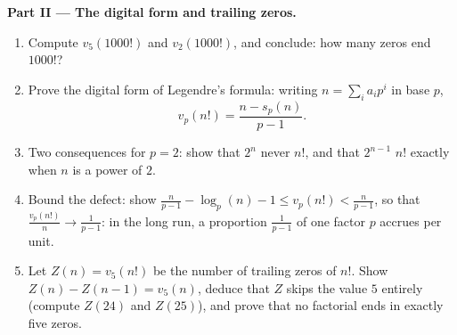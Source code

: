 \begin{problem}
\medskip
\noindent\textbf{Part II --- The digital form and trailing
zeros.}
\begin{enumerate}[resume]
  \item Compute $v_5(1000!)$ and $v_2(1000!)$, and conclude: how
        many zeros end $1000!$?
  \item Prove the digital form of Legendre's formula: writing $n =
        \sum_i a_i p^i$ in base $p$,
        \[
        v_p(n!) = \frac{n - s_p(n)}{p - 1} .
        \]
  \item Two consequences for $p = 2$: show that $2^n$ never
         $n!$, and that $2^{n-1}$  $n!$ exactly when
        $n$ is a power of $2$.
  \item Bound the defect: show $\frac n{p-1} - \log_p(n) - 1 \leq
        v_p(n!) < \frac n{p-1}$, so that $\frac{v_p(n!)}{n} \to
        \frac1{p-1}$: in the long run, a proportion
        $\frac1{p-1}$ of one factor $p$ accrues per unit.
  \item Let $Z(n) = v_5(n!)$ be the number of trailing zeros of
        $n!$. Show $Z(n) - Z(n-1) = v_5(n)$, deduce that $Z$ skips
        the value $5$ entirely (compute $Z(24)$ and $Z(25)$), and
        prove that no factorial ends in exactly five zeros.
\end{enumerate}


\end{problem}
